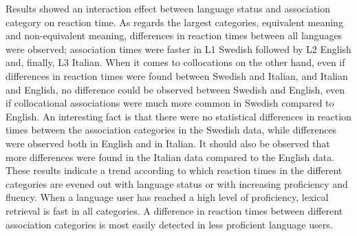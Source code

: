 \documentclass[output=paper,colorlinks,citecolor=brown,nonflat]{langsci/langscibook}
\begin{document}
Results showed an interaction effect between language status and association category on reaction time. As regards the largest categories, equivalent meaning and non-equivalent meaning, differences in reaction times between all languages were observed; association times were faster in L1 Swedish followed by L2 English and, finally, L3 Italian. When it comes to collocations on the other hand, even if differences in reaction times were found between Swedish and Italian, and Italian and English, no difference could be observed between Swedish and English, even if collocational associations were much more common in Swedish compared to English. An interesting fact is that there were no statistical differences in reaction times between the association categories in the Swedish data, while differences were observed both in English and in Italian. It should also be observed that more differences were found in the Italian data compared to the English data. These results indicate a trend according to which reaction times in the different categories are evened out with language status or with increasing proficiency and fluency. When a language user has reached a high level of proficiency, lexical retrieval is fast in all categories. A difference in reaction times between different association categories is most easily detected in less proficient language users.
\end{document}

